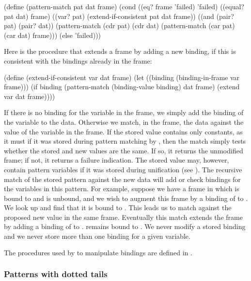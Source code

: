 \begin{codeBlock}
(define (pattern-match pat dat frame)
  (cond ((eq? frame 'failed) 'failed)
        ((equal? pat dat) frame)
        ((var? pat) (extend-if-consistent pat dat frame))
        ((and (pair? pat) (pair? dat))
         (pattern-match
          (cdr pat)
          (cdr dat)
          (pattern-match (car pat) (car dat) frame)))
        (else 'failed)))
\end{codeBlock}

\noindent
Here is the procedure that extends a frame by adding a new binding, if this is
consistent with the bindings already in the frame:

\begin{codeBlock}
(define (extend-if-consistent var dat frame)
  (let ((binding (binding-in-frame var frame)))
    (if binding
        (pattern-match (binding-value binding) dat frame)
        (extend var dat frame))))
\end{codeBlock}

\noindent
If there is no binding for the variable in the frame, we simply add the binding
of the variable to the data.  Otherwise we match, in the frame, the data
against the value of the variable in the frame.  If the stored value contains
only constants, as it must if it was stored during pattern matching by
, then the match simply tests whether the stored and
new values are the same.  If so, it returns the unmodified frame; if not, it
returns a failure indication.  The stored value may, however, contain pattern
variables if it was stored during unification (see ).  The
recursive match of the stored pattern against the new data will add or check
bindings for the variables in this pattern.  For example, suppose we have a
frame in which  is bound to  and  is unbound,
and we wish to augment this frame by a binding of  to .
We look up  and find that it is bound to .  This leads us
to match  against the proposed new value  in the same
frame.  Eventually this match extends the frame by adding a binding of
 to .   remains bound to .  We never
modify a stored binding and we never store more than one binding for a given
variable.

The procedures used by  to manipulate bindings are
defined in .

\subsubsection*{Patterns with dotted tails}

